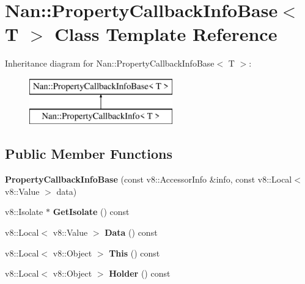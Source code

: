 \hypertarget{class_nan_1_1_property_callback_info_base}{}\section{Nan\+:\+:Property\+Callback\+Info\+Base$<$ T $>$ Class Template Reference}
\label{class_nan_1_1_property_callback_info_base}
Inheritance diagram for Nan\+:\+:Property\+Callback\+Info\+Base$<$ T $>$\+:\begin{figure}[H]
\begin{center}
\leavevmode
\includegraphics[height=2.000000cm]{class_nan_1_1_property_callback_info_base}
\end{center}
\end{figure}
\subsection*{Public Member Functions}
\begin{DoxyCompactItemize}
\item 
\mbox{\label{class_nan_1_1_property_callback_info_base_a1e42608ee0215380c79f1884f46c72c5}} 
{\bfseries Property\+Callback\+Info\+Base} (const v8\+::\+Accessor\+Info \&info, const v8\+::\+Local$<$ v8\+::\+Value $>$ data)
\item 
\mbox{\label{class_nan_1_1_property_callback_info_base_a5588a17f261452516e986a3ada96b76d}} 
v8\+::\+Isolate $\ast$ {\bfseries Get\+Isolate} () const
\item 
\mbox{\label{class_nan_1_1_property_callback_info_base_a3507d44028f0d6bf50e4637c1650ae16}} 
v8\+::\+Local$<$ v8\+::\+Value $>$ {\bfseries Data} () const
\item 
\mbox{\label{class_nan_1_1_property_callback_info_base_a2e3c3ce0d32b5e90cf9fa7a718f210e8}} 
v8\+::\+Local$<$ v8\+::\+Object $>$ {\bfseries This} () const
\item 
\mbox{\label{class_nan_1_1_property_callback_info_base_a8e2a1820b323350ed918e3a9ebef1b50}} 
v8\+::\+Local$<$ v8\+::\+Object $>$ {\bfseries Holder} () const
\end{DoxyCompactItemize}
